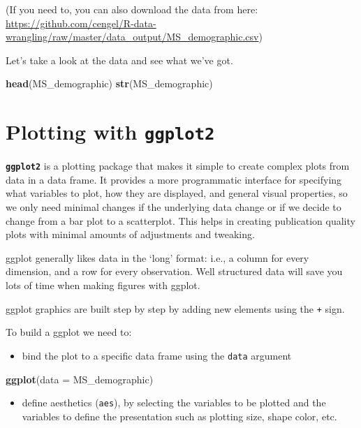 \documentclass[]{book}
\newenvironment{Shaded}{\begin{snugshade}}{\end{snugshade}}
\newcommand{\KeywordTok}[1]{\textcolor[rgb]{0.13,0.29,0.53}{\textbf{#1}}}
\newcommand{\DataTypeTok}[1]{\textcolor[rgb]{0.13,0.29,0.53}{#1}}
\newcommand{\NormalTok}[1]{#1}
\providecommand{\tightlist}{%
  \setlength{\itemsep}{0pt}\setlength{\parskip}{0pt}}
\theoremstyle{definition}
\theoremstyle{definition}
\theoremstyle{definition}
\theoremstyle{remark}
\begin{document}
(If you need to, you can also download the data from here:
\url{https://github.com/cengel/R-data-wrangling/raw/master/data_output/MS_demographic.csv})

Let's take a look at the data and see what we've got.

\begin{Shaded}
\begin{Highlighting}[]
\KeywordTok{head}\NormalTok{(MS_demographic)}
\KeywordTok{str}\NormalTok{(MS_demographic)}
\end{Highlighting}
\end{Shaded}

\section{\texorpdfstring{Plotting with
\textbf{\texttt{ggplot2}}}{Plotting with ggplot2}}\label{plotting-with-ggplot2}

\textbf{\texttt{ggplot2}} is a plotting package that makes it simple to
create complex plots from data in a data frame. It provides a more
programmatic interface for specifying what variables to plot, how they
are displayed, and general visual properties, so we only need minimal
changes if the underlying data change or if we decide to change from a
bar plot to a scatterplot. This helps in creating publication quality
plots with minimal amounts of adjustments and tweaking.

ggplot generally likes data in the `long' format: i.e., a column for
every dimension, and a row for every observation. Well structured data
will save you lots of time when making figures with ggplot.

ggplot graphics are built step by step by adding new elements using the
\texttt{+} sign.

To build a ggplot we need to:

\begin{itemize}
\tightlist
\item
  bind the plot to a specific data frame using the \texttt{data}
  argument
\end{itemize}

\begin{Shaded}
\begin{Highlighting}[]
\KeywordTok{ggplot}\NormalTok{(}\DataTypeTok{data =}\NormalTok{ MS_demographic)}
\end{Highlighting}
\end{Shaded}

\begin{itemize}
\tightlist
\item
  define aesthetics (\texttt{aes}), by selecting the variables to be
  plotted and the variables to define the presentation such as plotting
  size, shape color, etc.
\end{itemize}
\end{document}
